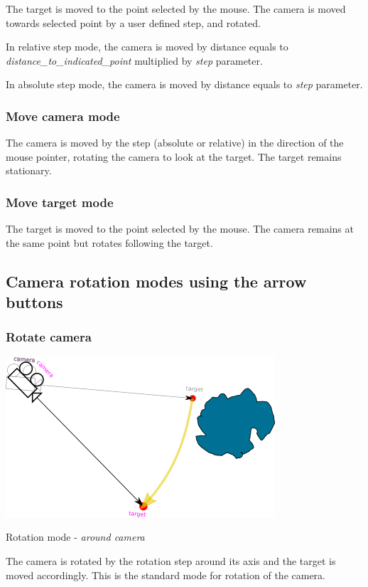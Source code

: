 The target is moved to the point selected by the mouse. The camera is moved
towards selected point by a user defined step, and rotated.

In relative step mode, the camera is moved by distance equals to
\emph{distance\_to\_indicated\_point} multiplied by \emph{step} parameter.

In absolute step mode, the camera is moved by distance equals to \emph{step}
parameter.

\subsubsection{Move camera mode}\label{move-camera-mode-1}

The camera is moved by the step (absolute or relative) in the direction of the
mouse pointer, rotating the camera to look at the target. The target remains
stationary.

\subsubsection{Move target mode}\label{move-target-mode-1}

The target is moved to the point selected by the mouse. The camera remains at
the same point but rotates following the target.

\subsection{Camera rotation modes using the arrow
	buttons}\label{camera-rotation-modes-using-the-arrow-buttons}

\subsubsection{Rotate camera}\label{rotate-camera}
\nopagebreak

\includegraphics[width=0.5\linewidth]{img/manual/media/rotate_camera}
\nopagebreak

Rotation mode - \emph{around camera}
\nopagebreak

The camera is rotated by the rotation step around its axis and the target is
moved accordingly. This is the standard mode for rotation of the camera.

